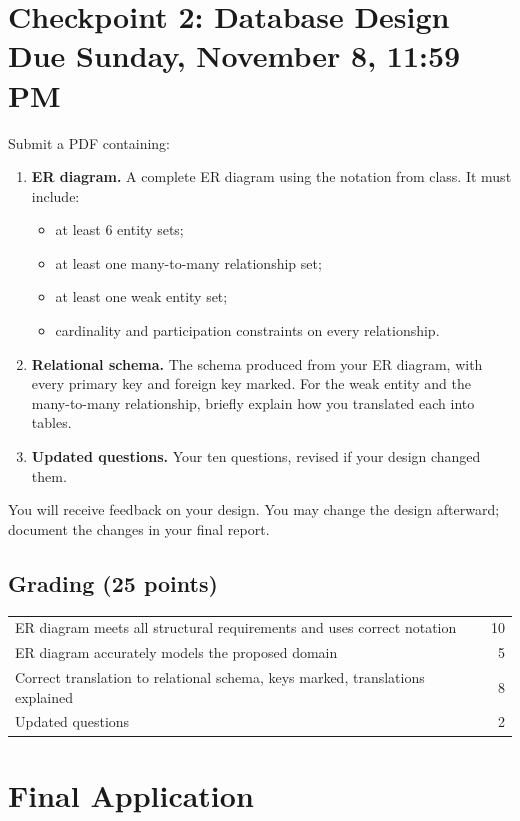 \documentclass[11pt]{article}
\newcommand{\cptwodue}{Sunday, November 8, 11:59\,PM}
\begin{document}
\section{Checkpoint 2: Database Design \hfill {\normalsize Due \cptwodue}}

Submit a PDF containing:
\begin{enumerate}
  \item \textbf{ER diagram.} A complete ER diagram using the notation from class. It must include:
    \begin{itemize}
      \item at least 6 entity sets;
      \item at least one many-to-many relationship set;
      \item at least one weak entity set;
      \item cardinality and participation constraints on every relationship.
    \end{itemize}
  \item \textbf{Relational schema.} The schema produced from your ER diagram, with every primary key and foreign key marked. For the weak entity and the many-to-many relationship, briefly explain how you translated each into tables.
  \item \textbf{Updated questions.} Your ten questions, revised if your design changed them.
\end{enumerate}

\noindent You will receive feedback on your design. You may change the design afterward; document the changes in your final report.

\subsection*{Grading (25 points)}
\begin{tabularx}{\textwidth}{@{}Xr@{}}
ER diagram meets all structural requirements and uses correct notation & 10 \\
ER diagram accurately models the proposed domain & 5 \\
Correct translation to relational schema, keys marked, translations explained & 8 \\
Updated questions & 2 \\
\end{tabularx}

\section{Final Application}
\end{document}
